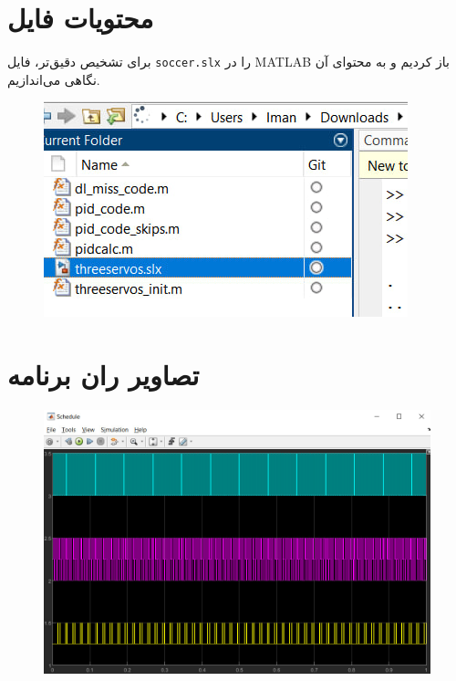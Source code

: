\newpage

\section*{محتویات فایل }

برای تشخیص دقیق‌تر، فایل \texttt{soccer.slx} را در MATLAB باز کردیم و به محتوای آن نگاهی می‌اندازیم.

\begin{figure}[H]
	\centering
	\includegraphics{4.jpg}
	\label{fig:label4}
\end{figure}

\newpage

\section*{تصاویر ران برنامه}

\begin{figure}[H]
	\centering
	\includegraphics{6.jpg}
	\label{fig:label4}
\end{figure}

